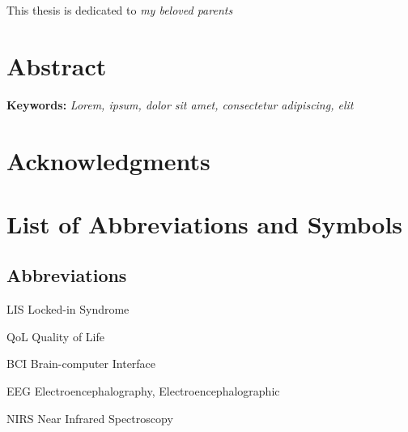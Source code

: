 \documentclass[11pt,a4paper]{report}
\numberwithin{equation}{section}
\newcommand{\acrolabel}[1]{\makebox[3cm][l]{\textbf{#1}}}
\newenvironment{acronyms}{\begin{list}{}{\renewcommand{\makelabel}{\acrolabel}}}{\end{list}}
\begin{document}
    \newpage
    \vspace*{8cm}
    \begin{center}
        \Large This thesis is dedicated to \emph{my beloved parents}
    \end{center}

    \newpage
    \chapter*{Abstract}
    \lipsum[2-4]
    \textbf{Keywords:} \textit{Lorem, ipsum, dolor sit amet, consectetur adipiscing, elit}

    \newpage
    \chapter*{Acknowledgments}
    \lipsum[2-4]

    \newpage
    \tableofcontents

    \listoffigures
    \listoftables

    \newpage
    \chapter*{List of Abbreviations and Symbols}
    \section*{Abbreviations}
    \begin{acronyms}
    \item[LIS] Locked-in Syndrome
    \item[QoL] Quality of Life
    \item[BCI] Brain-computer Interface
    \item[EEG] Electroencephalography, Electroencephalographic
    \item[NIRS] Near Infrared Spectroscopy
    \end{acronyms}

    \newpage

    
    

    
\end{document}
